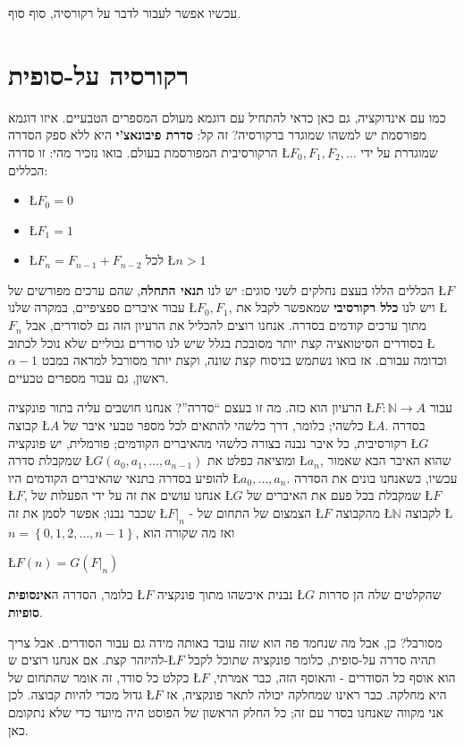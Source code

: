 \documentclass[english,hebrew]{article}
\begin{document}
עכשיו אפשר לעבור לדבר על רקורסיה, סוף סוף.

\section*{רקורסיה על-סופית}

כמו עם אינדוקציה, גם כאן כדאי להתחיל עם דוגמא מעולם המספרים הטבעיים.
איזו דוגמא מפורסמת יש למשהו שמוגדר ברקורסיה? זה קל: \textbf{סדרת פיבונאצ'י}
היא ללא ספק הסדרה הרקורסיבית המפורסמת בעולם. בואו נזכיר מהי: זו סדרה
\L{$F_{0},F_{1},F_{2},\ldots$} שמוגדרת על ידי הכללים:
\begin{itemize}
\item \L{$F_{0}=0$}
\item \L{$F_{1}=1$}
\item \L{$F_{n}=F_{n-1}+F_{n-2}$} לכל \L{$n>1$}
\end{itemize}
הכללים הללו בעצם נחלקים לשני סוגים: יש לנו \textbf{תנאי התחלה}, שהם
ערכים מפורשים של \L{$F$} עבור איברים ספציפיים, במקרה שלנו \L{$F_{0},F_{1}$},
ויש לנו \textbf{כלל רקורסיבי} שמאפשר לקבל את \L{$F_{n}$} מתוך ערכים
קודמים בסדרה. אנחנו רוצים להכליל את הרעיון הזה גם לסודרים, אבל בסודרים
הסיטואציה קצת יותר מסובכת בגלל שיש לנו סודרים גבוליים שלא נוכל לכתוב
\L{$\alpha-1$} וכדומה עבורם. אז בואו נשתמש בניסוח קצת שונה, וקצת
יותר מסורבל למראה במבט ראשון, גם עבור מספרים טבעיים.

הרעיון הוא כזה. מה זו בעצם \textquotedblleft סדרה\textquotedblright ?
אנחנו חושבים עליה בתור פונקציה \L{$F:\mathbb{N}\to A$} עבור קבוצה
\L{$A$} כלשהי; כלומר, דרך כלשהי להתאים לכל מספר טבעי איבר של \L{$A$}.
בסדרה רקורסיבית, כל איבר נבנה בצורה כלשהי מהאיברים הקודמים; פורמלית,
יש פונקציה \L{$G$} שמקבלת סדרה \L{$G\left(a_{0},a_{1},\ldots,a_{n-1}\right)$}
ומוציאה כפלט את \L{$a_{n}$}, שהוא האיבר הבא שאמור להופיע בסדרה בתנאי
שהאיברים הקודמים היו \L{$a_{0},\ldots,a_{n}$}. עכשיו, כשאנחנו בונים
את הסדרה \L{$F$}, אנחנו עושים את זה על ידי הפעלות של \L{$G$} שמקבלת
בכל פעם את האיברים של \L{$F$} שכבר נבנו; אפשר לסמן את זה \L{$F|_{n}$}
- הצמצום של התחום של \L{$F$} מהקבוצה \L{$\mathbb{N}$} לקבוצה \L{$n=\left\{ 0,1,2,\ldots,n-1\right\} $},
ואז מה שקורה הוא

\L{$F\left(n\right)=G\left(F|_{n}\right)$}

כלומר, הסדרה ה\textbf{אינסופית} \L{$F$} נבנית איכשהו מתוך פונקציה
\L{$G$} שהקלטים שלה הן סדרות \textbf{סופיות}.

מסורבל? כן, אבל מה שנחמד פה הוא שזה עובד באותה מידה גם עבור הסודרים.
אבל צריך להיזהר קצת. אם אנחנו רוצים ש-\L{$F$} תהיה סדרה על-סופית,
כלומר פונקציה שתוכל לקבל כקלט כל סודר, זה אומר שהתחום של \L{$F$}
הוא אוסף כל הסודרים - והאוסף הזה, כבר אמרתי, גדול מכדי להיות קבוצה.
לכן \L{$F$} היא מחלקה. כבר ראינו שמחלקה יכולה לתאר פונקציה, אז אני
מקווה שאנחנו בסדר עם זה; כל החלק הראשון של הפוסט היה מיועד כדי שלא
נתקומם כאן.
\end{document}
